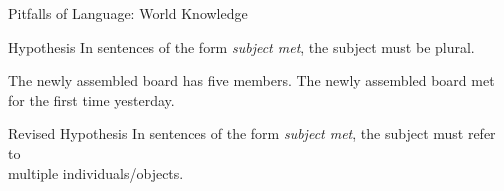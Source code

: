 \documentclass[xcolor={usenames,svgnames,x11names,dvipsnames,table}]{beamer}
\begin{document}
\begin{frame}{Pitfalls of Language: World Knowledge}
    \begin{exe}
        \small
        \ex
        \begin{xlist}
        \end{xlist}
        \ex
        \begin{xlist}
        \end{xlist}
    \end{exe}

    \begin{block}{Hypothesis}
        In sentences of the form \emph{subject met}, the subject must be plural.
    \end{block}

    \pause
    \begin{exe}
        \small
        \ex
        \begin{xlist}
            \ex The newly assembled board has five members.\hfill {}
            \ex The newly assembled board met for the first time yesterday.
        \end{xlist}
    \end{exe}

    \begin{block}{Revised Hypothesis}
        In sentences of the form \emph{subject met}, the subject must refer to\\
        multiple individuals\slash objects.
    \end{block}
\end{frame}
\end{document}
